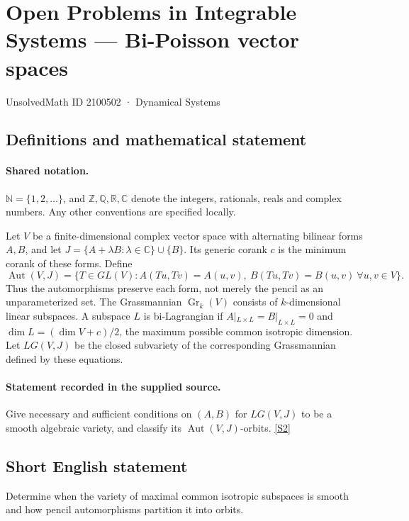 \documentclass[11pt]{article}
\newcommand{\sref}[2]{\hyperlink{source:#1:#2}{[S#2]}}
\begin{document}
\setcounter{section}{2100501}
\section{Open Problems in Integrable Systems — Bi-Poisson vector spaces}\label{2100502}
{\small\sffamily UnsolvedMath ID 2100502 · Dynamical Systems}
\subsection{Definitions and mathematical statement}

\paragraph{Shared notation.}$\mathbb N=\{1,2,\ldots\}$, and $\mathbb Z,\mathbb Q,\mathbb R,\mathbb C$ denote the integers, rationals, reals and complex numbers. Any other conventions are specified locally.


Let $V$ be a finite-dimensional complex vector space with alternating bilinear forms $A,B$, and let $J=\{A+\lambda B:\lambda\in\mathbb C\}\cup\{B\}$. Its generic corank $c$ is the minimum corank of these forms. Define \[\operatorname{Aut}(V,J)=\{T\in GL(V):A(Tu,Tv)=A(u,v),\ B(Tu,Tv)=B(u,v)\ \forall u,v\in V\}.\] Thus the automorphisms preserve each form, not merely the pencil as an unparameterized set. The Grassmannian $\operatorname{Gr}_k(V)$ consists of $k$-dimensional linear subspaces. A subspace $L$ is bi-Lagrangian if $A|_{L\times L}=B|_{L\times L}=0$ and $\dim L=(\dim V+c)/2$, the maximum possible common isotropic dimension. Let $LG(V,J)$ be the closed subvariety of the corresponding Grassmannian defined by these equations.
\paragraph{Statement recorded in the supplied source.}
Give necessary and sufficient conditions on $(A,B)$ for $LG(V,J)$ to be a smooth algebraic variety, and classify its $\operatorname{Aut}(V,J)$-orbits. \sref{2100502}{2}
\subsection{Short English statement}
Determine when the variety of maximal common isotropic subspaces is smooth and how pencil automorphisms partition it into orbits.
\end{document}
